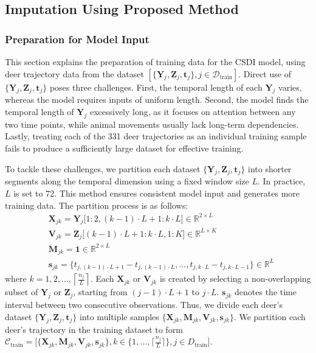 \documentclass[11pt]{article}
\begin{document}
\subsection{Imputation Using Proposed Method}
\subsubsection{Preparation for Model Input}\label{sec: model training}
This section explains the preparation of training data for the CSDI model, using deer trajectory data from the dataset $[\{\bm{Y}_j,\bm{Z}_j,\bm{t}_j\},j\in \mathcal{D}_{\mathrm{train}}]$. Direct use of $\{\bm{Y}_j,\bm{Z}_j,\bm{t}_j\}$ poses three challenges. First, the temporal length of each $\bm{Y}_j$ varies, whereas the model requires inputs of uniform length. Second, the model finds the temporal length of $\bm{Y}_j$ excessively long, as it focuses on attention between any two time points, while animal movements usually lack long-term dependencies. Lastly, treating each of the 331 deer trajectories as an individual training sample fails to produce a sufficiently large dataset for effective training.


To tackle these challenges, we partition each dataset $\{\bm{Y}_j,\bm{Z}_j,\bm{t}_j\}$ into shorter segments along the temporal dimension using a fixed window size $L$. In practice, $L$ is set to 72. This method ensures consistent model input and generates more training data. The partition process is as follows:
\begin{align}
	&\bm{X}_{jk} = \bm{Y}_j\big[1:2,(k-1)\cdot L+1: k\cdot L\big]\in \mathbb{R}^{2\times L}\\
	&\bm{V}_{jk} = \bm{Z}_j\big[(k-1)\cdot L+1: k\cdot L, 1:K\big]\in \mathbb{R}^{L\times K}\\
	&\bm{M}_{jk}=\mathbf{1}\in \mathbb{R}^{2 \times L}\\
	&\bm{s}_{jk}=\{t_{j,(k-1)\cdot L+1}-t_{j,(k-1)\cdot L},\ldots, t_{j,k\cdot L}-t_{j,k\cdot L-1}\}\in \mathbb{R}^L
\end{align}
where $k=1,2,\ldots,\left\lceil\frac{n_j}{L}\right\rceil$. Each $\bm{X}_{jk}$ or $\bm{V}_{jk}$ is created by selecting a non-overlapping subset of $\bm{Y}_j$ or $\bm{Z}_j$, starting from $(j-1)\cdot L+1$ to $j\cdot L$. $\bm{s}_{jk}$ denotes the time interval between two consecutive observations. Thus, we divide each deer's dataset $\{\bm{Y}_j,\bm{Z}_j,\bm{t}_j\}$ into multiple samples $\{\bm{X}_{jk},\bm{M}_{jk},\bm{V}_{jk}, \bm{s}_{jk}\}$. We partition each deer's trajectory in the training dataset to form $\mathcal{C}_{\mathrm{train}}=\big[\{\bm{X}_{jk},\bm{M}_{jk},\bm{V}_{jk}, \bm{s}_{jk}\}, k\in \{1,\ldots, \lceil \frac{n_j}{L}\rceil\},j\in D_{\mathrm{train}}\big]$.
\end{document}
